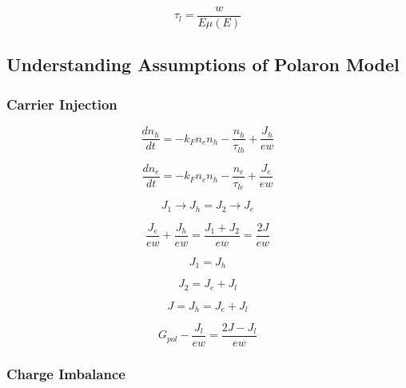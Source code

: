 \documentclass[../thesis.tex]{subfiles}
\begin{document}
\begin{equation}
\tau_l=\frac{w}{E\mu(E)}
\label{eqn:drift}
\end{equation}


\subsection{Understanding Assumptions of Polaron Model}
\subsubsection{Carrier Injection}

\begin{equation}
\frac{dn_h}{dt}=-k_Fn_en_h-\frac{n_h}{\tau_{lh}}+\frac{J_h}{ew}
\label{eqn:hole_rate}
\end{equation}

\begin{equation}
\frac{dn_e}{dt}=-k_Fn_en_h-\frac{n_e}{\tau_{le}}+\frac{J_e}{ew}
\label{eqn:electron_rate}
\end{equation}

\begin{equation}
J_1\rightarrow J_h = J_2 \rightarrow J_e
\label{eqn:current_no_leakage}
\end{equation}

\begin{equation}
\frac{J_e}{ew}+\frac{J_h}{ew}=\frac{J_1+J_2}{ew}=\frac{2J}{ew}
\label{eqn:injected_polarons_no_leakage}
\end{equation}

\begin{equation}
J_1=J_h
\label{eqn:current_holes_leakage}
\end{equation}

\begin{equation}
J_2=J_e+J_l
\label{eqn:current_electrons_leakage}
\end{equation}

\begin{equation}
J=J_h=J_e+J_l
\label{eqn:current_continuity_leakage}
\end{equation}

\begin{equation}
G_{pol}-\frac{J_l}{ew}=\frac{2J-J_l}{ew}
\label{polaron_generation}
\end{equation}

\subsubsection{Charge Imbalance}
\end{document}
